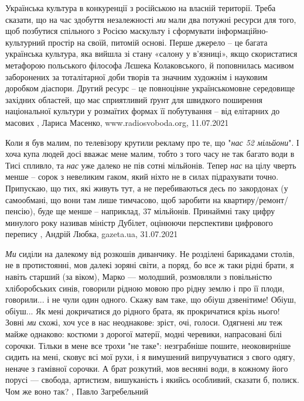Українська культура в конкуренції з російською на власній території.  Треба
сказати, що на час здобуття незалежності \emph{ми} мали два потужні ресурси для
того, щоб позбутися спільного з Росією маскульту і сформувати
інформаційно-культурний простір на своїй, питомій основі.  Перше джерело – це
багата українська культура, яка вийшла зі стану «салону у в’язниці», якщо
скористатися метафорою польського філософа Лєшека Колаковського, й поповнилась
масивом заборонених за тоталітарної доби творів та значним художнім і науковим
доробком діаспори.  Другий ресурс – це повноцінне українськомовне середовище
західних областей, що має сприятливий ґрунт для швидкого поширення національної
культури у розмаїтих формах її побутування – від елітарних до масових
, 
Лариса Масенко, www.radiosvoboda.org, 11.07.2021

Коли я був малим, по телевізору крутили рекламу про те, що "\emph{нас 52 мільйони}". І
хоча купа людей досі вважає мене малим, тобто з того часу не так багато води в
Тисі спливло, та \emph{нас} уже далеко не пів сотні мільйонів.  Тепер \emph{нас} на цілу
чверть менше – сорок з невеликим гаком, який ніхто не в силах підрахувати
точно. Припускаю, що тих, які живуть тут, а не перебиваються десь по закордонах
(у самообмані, що вони там лише тимчасово, щоб заробити на
квартиру/ремонт/пенсію), буде ще менше – наприклад, 37 мільйонів. Принаймні
таку цифру минулого року називав міністр Дубілет, оцінюючи перспективи
цифрового перепису
, 
Андрій Любка, gazeta.ua, 31.07.2021

\emph{Ми} сиділи на далекому від розкошів диванчику. Не розділені барикадами
столів, не в протистоянні, мов далекі зоряні світи, а поряд, бо все ж таки
рідні брати, я навіть старший (за віком), Марко — молодший, розмовляли з
повільністю хліборобських синів, говорили рідною мовою про рідну землю і про її
плоди, говорили... і не чули один одного. Скажу вам таке, що обіуш дзвенітиме!
Обіуш, обіуш...  Як мені докричатися до рідного брата, як прокричатися крізь
нього!  Зовні \emph{ми} схожі, хоч усе в нас неоднакове: зріст, очі, голоси.
Одягнені \emph{ми} теж майже однаково: костюми з дорогої матерії, модні черевики,
напрасовані білі сорочки. Тільки в мене все трохи "не таке": незграбніше
пошите, неоковирніше сидить на мені, сковує всі мої рухи, і я вимушений
випручуватися з свого одягу, неначе з гамівної сорочки. А брат розкутий, мов
весняні води, в кожному його порусі — свобода, артистизм, вишуканість і якийсь
особливий, сказати б, полиск. Чом же воно так?
, Павло Загребельний 


